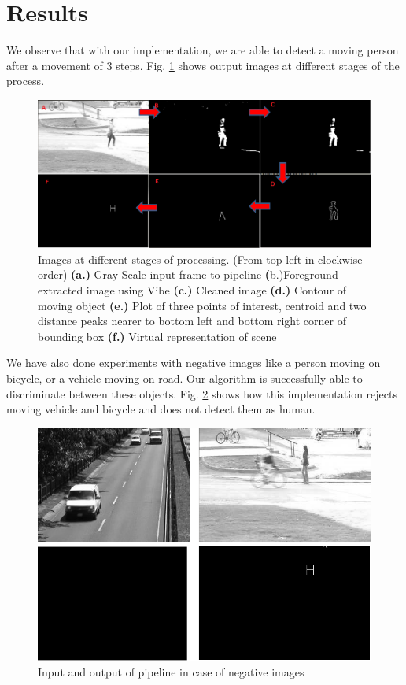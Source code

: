 \documentclass[conference]{IEEEtran}
\begin{document}
\section{Results}
We observe that with our implementation, we are able to detect a moving
person after a movement of 3 steps. Fig.  \ref{pipeline_images} shows
output images at different stages of the process.

\begin{figure}[!h]
\centering
\includegraphics[scale=0.30]{figures/pipeline_images}
\caption{Images at different stages of processing. (From top left in
clockwise order) \textbf{(a.)} Gray Scale input frame to pipeline
\textbf({b.)}Foreground extracted image using Vibe \textbf{(c.)} Cleaned
image \textbf{(d.)} Contour of moving object \textbf{(e.)} Plot of three points
of interest, centroid and two distance peaks nearer to bottom left and
bottom right corner of bounding box \textbf{(f.)} Virtual representation
of scene} 
\label{pipeline_images}
\end{figure}

\indent We have also done experiments with negative images like a person moving
on bicycle, or a vehicle moving on road. Our algorithm is successfully
able to discriminate between these objects. Fig. \ref{negative_inputs} shows
how this implementation rejects moving vehicle and bicycle and  does
not detect them as human.
\begin{figure}[!h]
\centering
\includegraphics[scale=0.30]{figures/negative_inputs}
\caption{Input and output of pipeline in case of negative images}
\label{negative_inputs}
\end{figure}
\end{document}
